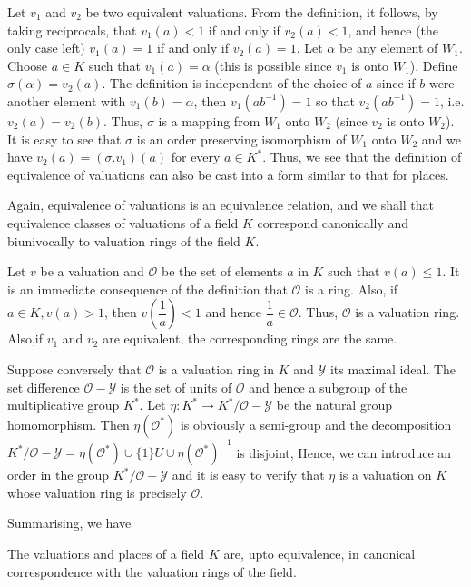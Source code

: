Let $v_1$ and $v_2$ be two equivalent valuations. From the definition,
it follows, by taking reciprocals, that $v_1(a) < 1$ if and only if
$v_2(a) < 1$, and hence (the only case left) $v_1(a) = 1$ if and only
if $v_2(a) = 1$. Let $\alpha$ be any element of $W_1$. Choose $a \in
K$ such that $v_1(a) = \alpha$ (this is possible since $v_1$ is onto
$W_1$). Define $\sigma (\alpha) = v_2(a)$. The definition is independent
of the choice of $a$ since if $b$ were another element with $v_1(b) =
\alpha$, then $v_1(ab^{-1}) = 1$ so that $v_2(ab^{-1}) = 1$,
i.e. $v_2(a) = v_2(b) $. Thus, $\sigma$ is a  mapping from $W_1$ onto
$W_2$ (since $v_2$ is onto $W_2$). It is easy to see that $\sigma$ is
an order preserving isomorphism of $W_1$ onto $W_2$ and we have
$v_2(a) = (\sigma . v_1)(a)$ for every $a \in K^*$. Thus, we see that
the definition of equivalence of valuations can also be cast into a
form similar to that for places. 

Again, equivalence of valuations is an equivalence relation,  and we
shall that equivalence classes of valuations of a field $K$ correspond
cano\-nically and biunivocally to valuation rings of the field $K$. 

Let $v$ be a valuation and $\mathscr{O}$ be the set of elements $a$ in
$K$ such that $v(a) \le 1$. It is an immediate consequence of the
definition that $\mathscr{O}$ is a ring. Also, if $a \in K, v(a) > 1$,
then $v\left(\dfrac{1}{a}\right) < 1$ and hence $\dfrac{1}{a} \in
\mathscr{O}$. Thus, $\mathscr{O}$ is a valuation ring. Also,\pageoriginale if $v_1$
and $v_2$ are equivalent, the corresponding rings are the same. 

Suppose conversely that $\mathscr{O}$ is a valuation ring in $K$ and
$\mathscr{Y}$ its maximal ideal. The set difference $\mathscr{O}-
\mathscr{Y}$ is the set of units of $\mathscr{O}$ and hence a subgroup
of the multiplicative group $K^*$. Let $\eta : K^* \rightarrow K^* /
\mathscr{O}-\mathscr{Y}$ be the natural group homomorphism. Then $\eta
(\mathscr{O}^*)$ is obviously a semi-group and the decomposition $K^* /
\mathscr{O}-\mathscr{Y}= \eta (\mathscr{O}^*) \cup \{ 1\} U\cup\eta
(\mathscr{O}^*)^{-1}$ is disjoint, Hence, we can introduce an order in
the group $K^* /\mathscr{O}-\mathscr{Y}$ and it is easy to verify that
$\eta$ is a valuation on $K$ whose valuation ring is precisely
$\mathscr{O}$. 

Summarising, we have

\begin{theorem*}
  The valuations and places of a field $K$ are, upto equivalence, in
  canonical correspondence with the valuation rings of the field. 
\end{theorem*}
